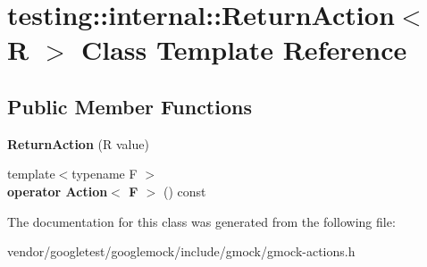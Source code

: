 \hypertarget{classtesting_1_1internal_1_1_return_action}{}\section{testing\+:\+:internal\+:\+:Return\+Action$<$ R $>$ Class Template Reference}
\label{classtesting_1_1internal_1_1_return_action}
\subsection*{Public Member Functions}
\begin{DoxyCompactItemize}
\item 
\mbox{\label{classtesting_1_1internal_1_1_return_action_af65344e503dae3ab36b4fd6d1ede6fb7}} 
{\bfseries Return\+Action} (R value)
\item 
\mbox{\label{classtesting_1_1internal_1_1_return_action_a1aab69c4ea104e76e70ba209763f61d5}} 
{\footnotesize template$<$typename F $>$ }\\{\bfseries operator Action$<$ F $>$} () const
\end{DoxyCompactItemize}


The documentation for this class was generated from the following file\+:\begin{DoxyCompactItemize}
\item 
vendor/googletest/googlemock/include/gmock/gmock-\/actions.\+h\end{DoxyCompactItemize}
